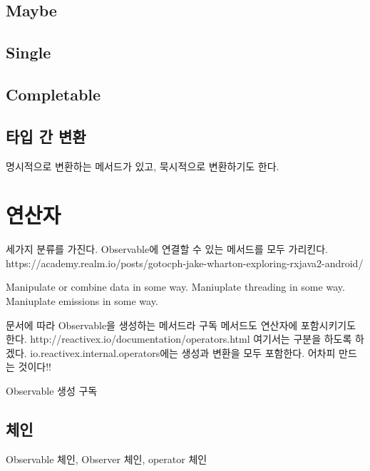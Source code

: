 \documentclass{book}
\begin{document}
\subsection{Maybe}

\subsection{Single}

\subsection{Completable}

\subsection{타입 간 변환}
명시적으로 변환하는 메서드가 있고, 묵시적으로 변환하기도 한다.

\section{연산자}
세가지 분류를 가진다. Observable에 연결할 수 있는 메서드를 모두 가리킨다.
https://academy.realm.io/posts/gotocph-jake-wharton-exploring-rxjava2-android/

Manipulate or combine data in some way.
Maniuplate threading in some way.
Maniuplate emissions in some way.

문서에 따라 Observable을 생성하는 메서드라 구독 메서드도 연산자에 포함시키기도 한다.
http://reactivex.io/documentation/operators.html
여기서는 구분을 하도록 하겠다.
io.reactivex.internal.operators에는 생성과 변환을 모두 포함한다.
어차피 만드는 것이다!!

Observable 생성
구독

\subsection{체인}
Observable 체인, Observer 체인, operator 체인
\end{document}
